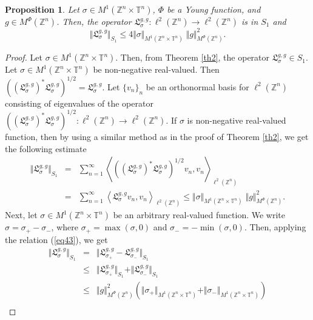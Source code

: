 \documentclass[10pt,a4paper]{amsart}
\newtheorem{proposition}{Proposition}
\def \T{{\mathbb T}}
\def \Z{{\mathbb Z}}
\begin{document}
\begin{proposition}\label{pro3}
Let $\sigma \in  M^1(\Z^n \times \T^n)$, $\Phi$ be a Young function, and $g \in  M^{\Phi}(\Z^n)$. Then, the operator $\mathfrak{L}^{g, g}_{\sigma}: \ell^2(\Z^n) \to \ell^2(\Z^n) $ is in $S_1$ and 
\[ \Vert \mathfrak{L}^{g, g}_{\sigma} \Vert_{S_1} \leq 4 \Vert \sigma \Vert_{M^1(\Z^n \times \T^n)} \;  \Vert g \Vert^2_{M^{\Phi}(\Z^n)}. \]
\end{proposition}

\begin{proof}
Let $\sigma \in  M^1(\Z^n \times \T^n)$. Then, from Theorem \ref{th2}, the operator $\mathfrak{L}^{g, g}_{\sigma} \in S_1$. Let $\sigma \in M^1(\Z^n \times \T^n)$ be non-negative real-valued. Then $(({\mathfrak{L}^{g, g}_{\sigma}})^* \mathfrak{L}^{g, g}_{\sigma})^{1/2}=\mathfrak{L}^{g, g}_{\sigma}$. Let $\{v_n\}_n$ be an orthonormal basis for $\ell^2(\Z^n)$ consisting of eigenvalues of the operator $(({\mathfrak{L}^{g, g}_{\sigma}})^* \mathfrak{L}^{g, g}_{\sigma})^{1/2}: \ell^2(\Z^n) \to \ell^2(\Z^n)$. If $\sigma$ is non-negative real-valued function, then by using a similar method as in the proof of Theorem \ref{th2}, we get the following estimate
\begin{eqnarray}\label{eq43}
\Vert \mathfrak{L}^{g, g}_{\sigma} \Vert_{S_1}
& =& \sum_{n=1}^\infty \left\langle (({\mathfrak{L}^{g, g}_{\sigma}})^* \mathfrak{L}^{g, g}_{\sigma})^{1/2}v_n, v_n \right\rangle_{\ell^2(\Z^n)} \nonumber \\
&=& \sum_{n=1}^\infty \left\langle \mathfrak{L}^{g, g}_{\sigma} v_n, v_n \right\rangle_{\ell^2(\Z^n)}  
\leq  \Vert \sigma \Vert_{M^1(\Z^n \times \T^n)} \; \Vert g \Vert^2_{M^{\Phi}(\Z^n)} .
\end{eqnarray}
Next, let $\sigma \in M^1(\Z^n \times \T^n)$ be an arbitrary real-valued function. We write $\sigma = \sigma_+ - \sigma_-$, where $\sigma_+=\max(\sigma, 0)$ and $\sigma_-=-\min(\sigma, 0)$. Then, applying the relation (\ref{eq43}), we get
\begin{eqnarray}\label{eq44}
\Vert \mathfrak{L}^{g, g}_{\sigma} \Vert_{S_1}
& = & \Vert \mathfrak{L}^{g, g}_{\sigma_+} -\mathfrak{L}^{g, g}_{\sigma_-} \Vert_{S_1} \nonumber \\
& \leq & \Vert \mathfrak{L}^{g, g}_{\sigma_+} \Vert_{S_1} +\Vert \mathfrak{L}^{g, g}_{\sigma_-} \Vert_{S_1} \nonumber \\
& \leq &  \Vert g \Vert^2_{M^{\Phi}(\Z^n)} (\Vert \sigma_+ \Vert_{M^1(\Z^n \times \T^n)} + \Vert \sigma_- \Vert_{M^1(\Z^n \times \T^n)}) \nonumber \\

\end{eqnarray}
\end{proof}
\end{document}
